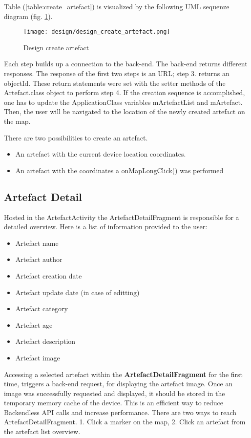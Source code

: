 Table (\ref{table:create_artefact}) is visualized by the following UML sequenze diagram (fig. \ref{fig:design_create_artefact}).

\begin{figure}[H]
    \centering \texttt{[image: design/design\_create\_artefact.png]}
    \caption[Design create artefact]{Design create artefact}    
    \label{fig:design_create_artefact}
\end{figure}

Each step builds up a connection to the back-end. The back-end returns different responses. The response of the first two steps is an URL; step 3. returns an objectId. These return statements were set with the setter methods of the Artefact.class object to perform step 4.
If the creation sequence is accomplished, one has to update the ApplicationClass variables mArtefactList and mArtefact. Then, the user will be navigated to the location of the newly created artefact on the map. 

There are two possibilities to create an artefact. 
\begin{itemize}
\item[1.] An artefact with the current device location coordinates.
\item[2.] An artefact with the coordinates a onMapLongClick() was performed
\end{itemize}


\subsection{Artefact Detail}
\label{section_artefact_detail}
Hosted in the ArtefactActivity the ArtefactDetailFragment is responsible for a detailed overview. Here is a list of information provided to the user:
\begin{itemize}
\item Artefact name
\item Artefact author
\item Artefact creation date
\item Artefact update date (in case of editting)
\item Artefact category
\item Artefact age
\item Artefact description
\item Artefact image
\end{itemize}

Accessing a selected artefact within the \textbf{ArtefactDetailFragment} for the first time, triggers a back-end request, for displaying the artefact image. Once an image was successfully requested and displayed, it should be stored in the temporary memory cache of the device. This is an efficient way to reduce Backendless API calls and increase performance.
There are two ways to reach ArtefactDetailFragment. 1. Click a marker on the map, 2. Click an artefact from the artefact list overview.

